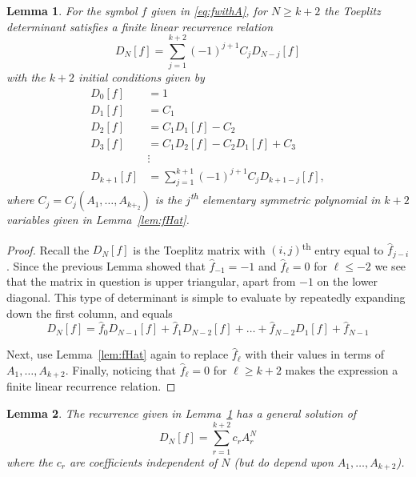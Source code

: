 \documentclass[12pt,a4paper,reqno]{amsart}
\newtheorem{lemma}{Lemma}
\theoremstyle{remark}
\numberwithin{equation}{section}
\begin{document}
\begin{lemma}\label{lem:recurrence}
    For the symbol $f$ given in \eqref{eq:fwithA}, for $N \geq k+2$ the Toeplitz determinant satisfies a finite linear recurrence relation
    \begin{equation*}
    D_{N}[f] = \sum_{j=1}^{k+2} (-1)^{j+1} C_j D_{N-j}[f]
    \end{equation*}
    with the $k+2$ initial conditions given by
    \begin{align*}
        D_0[f] &= 1\\
        D_1[f] &= C_1\\
        D_2[f] &= C_1 D_1[f] - C_2 \\
        D_3[f] &= C_1 D_2[f] - C_2 D_1[f] + C_3\\
        &\vdots\\
        D_{k+1}[f] &= \sum_{j=1}^{k+1} (-1)^{j+1} C_j D_{k+1-j}[f],
    \end{align*}
    where $C_j = C_j(A_1,\dots,A_{k+_2})$ is the $j$\textsuperscript{th} elementary symmetric polynomial in $k+2$ variables given in Lemma~\ref{lem:fHat}.
\end{lemma}

\begin{proof}
    Recall the $D_N[f]$ is the Toeplitz matrix with $(i,j)$\textsuperscript{th} entry equal to $\widehat f_{j-i}$. Since the previous Lemma showed that $\widehat f_{-1} = -1$ and $\widehat f_\ell = 0$ for $\ell \leq -2$ we see that the matrix in question is upper triangular, apart from $-1$ on the lower diagonal. This type of determinant is simple to evaluate by repeatedly expanding down the first column, and equals
 \[
D_{N}[f] = \widehat f_0 D_{N-1}[f] + \widehat f_1 D_{N-2}[f] + \dots + \widehat f_{N-2} D_1[f] + \widehat f_{N-1}
\]

Next, use Lemma~\ref{lem:fHat} again to replace $\widehat f_\ell$ with their values in terms of $A_1, \dots, A_{k+2}$. Finally,  noticing that $\widehat f_{\ell}=0$ for $\ell \geq k+2$ makes the expression a finite linear recurrence relation.
\end{proof}

\begin{lemma}\label{lem:RecurrenceGeneralSolution}
The recurrence given in Lemma~\ref{lem:recurrence} has a general solution of
\begin{equation}\label{eq:GenSolRec}
D_N[f] = \sum_{r=1}^{k+2} c_r A_r^N
\end{equation}
where the $c_r$ are coefficients independent of $N$ (but do depend upon $A_1,\dots,A_{k+2}$).
\end{lemma}
\end{document}
